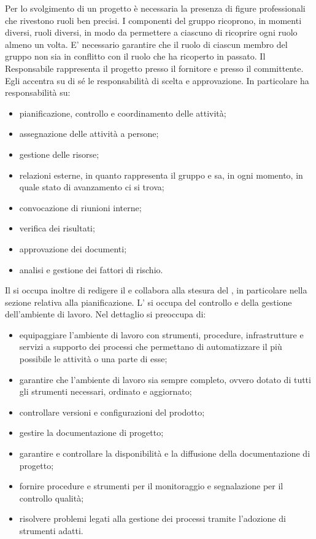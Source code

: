 			Per lo svolgimento di un progetto è necessaria la presenza di figure professionali che rivestono ruoli ben precisi. I componenti del gruppo ricoprono, in momenti diversi, ruoli diversi, in modo da permettere a ciascuno di ricoprire ogni ruolo almeno un volta. E' necessario garantire che il ruolo di ciascun membro del gruppo non sia in conflitto con il ruolo che ha ricoperto in passato.
				Il Responsabile rappresenta il progetto presso il fornitore e presso il committente. Egli accentra su di sé le responsabilità di scelta e approvazione. In particolare ha responsabilità su:
				\begin{itemize}
					\item pianificazione, controllo e coordinamento delle attività;
					\item assegnazione delle attività a persone;
					\item gestione delle risorse;
					\item relazioni esterne, in quanto rappresenta il gruppo e sa, in ogni momento, in quale stato di avanzamento ci si trova;
					\item convocazione di riunioni interne;
					\item verifica dei risultati;
					\item approvazione dei documenti;
					\item analisi e gestione dei fattori di rischio.
				\end{itemize}
				Il  si occupa inoltre di redigere il  e collabora alla stesura del , in particolare nella sezione relativa alla pianificazione.
				L' si occupa del controllo e della gestione dell'ambiente di lavoro. Nel dettaglio si preoccupa di:
				\begin{itemize}
					\item equipaggiare l'ambiente di lavoro con strumenti, procedure, infrastrutture e servizi a supporto dei processi che permettano di automatizzare il più possibile le attività o una parte di esse;
					\item garantire che l’ambiente di lavoro sia sempre completo, ovvero dotato di tutti gli strumenti necessari, ordinato e aggiornato;
					\item controllare versioni e configurazioni del prodotto;
					\item gestire la documentazione di progetto;
					\item garantire e controllare la disponibilità e la diffusione della documentazione di progetto;
					\item fornire procedure e strumenti per il monitoraggio e segnalazione per il controllo qualità;
					\item risolvere problemi legati alla gestione dei processi tramite l'adozione di strumenti adatti.
				\end{itemize}
